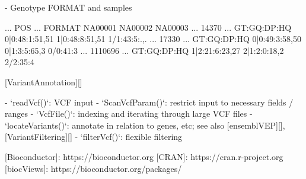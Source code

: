 - Genotype FORMAT and samples

          ... POS     ...  FORMAT      NA00001        NA00002        NA00003
          ... 14370   ...  GT:GQ:DP:HQ 0|0:48:1:51,51 1|0:48:8:51,51 1/1:43:5:.,.
          ... 17330   ...  GT:GQ:DP:HQ 0|0:49:3:58,50 0|1:3:5:65,3   0/0:41:3
          ... 1110696 ...  GT:GQ:DP:HQ 1|2:21:6:23,27 2|1:2:0:18,2   2/2:35:4

[VariantAnnotation][]

- `readVcf()`: VCF input
- `ScanVcfParam()`: restrict input to necessary fields / ranges
- `VcfFile()`: indexing and iterating through large VCF files
- `locateVariants()`: annotate in relation to genes, etc; see also
  [ensemblVEP][], [VariantFiltering][]
- `filterVcf()`: flexible filtering

[Bioconductor]: https://bioconductor.org
[CRAN]: https://cran.r-project.org
[biocViews]: https://bioconductor.org/packages/

